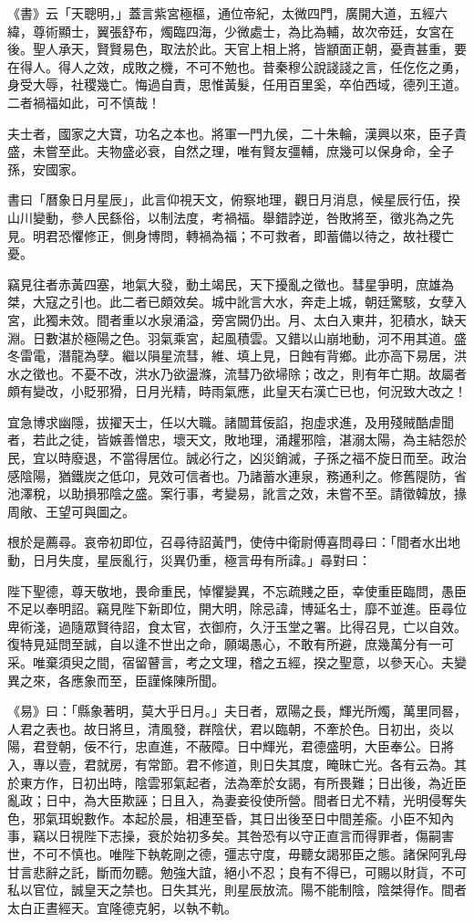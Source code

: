\begin{pinyinscope}
《書》云「天聰明，」蓋言紫宮極樞，通位帝紀，太微四門，廣開大道，五經六緯，尊術顯士，翼張舒布，燭臨四海，少微處士，為比為輔，故次帝廷，女宮在後。聖人承天，賢賢易色，取法於此。天官上相上將，皆顓面正朝，憂責甚重，要在得人。得人之效，成敗之機，不可不勉也。昔秦穆公說諓諓之言，任仡仡之勇，身受大辱，社稷幾亡。悔過自責，思惟黃髮，任用百里奚，卒伯西域，德列王道。二者禍福如此，可不慎哉！

夫士者，國家之大寶，功名之本也。將軍一門九侯，二十朱輪，漢興以來，臣子貴盛，未嘗至此。夫物盛必衰，自然之理，唯有賢友彊輔，庶幾可以保身命，全子孫，安國家。

書曰「曆象日月星辰」，此言仰視天文，俯察地理，觀日月消息，候星辰行伍，揆山川變動，參人民繇俗，以制法度，考禍福。舉錯誖逆，咎敗將至，徵兆為之先見。明君恐懼修正，側身博問，轉禍為福；不可救者，即蓄備以待之，故社稷亡憂。

竊見往者赤黃四塞，地氣大發，動土竭民，天下擾亂之徵也。彗星爭明，庶雄為桀，大寇之引也。此二者已頗效矣。城中訛言大水，奔走上城，朝廷驚駭，女孽入宮，此獨未效。間者重以水泉涌溢，旁宮闕仍出。月、太白入東井，犯積水，缺天淵。日數湛於極陽之色。羽氣乘宮，起風積雲。又錯以山崩地動，河不用其道。盛冬雷電，潛龍為孽。繼以隕星流彗，維、填上見，日蝕有背鄉。此亦高下易居，洪水之徵也。不憂不改，洪水乃欲盪滌，流彗乃欲埽除；改之，則有年亡期。故屬者頗有變改，小貶邪猾，日月光精，時雨氣應，此皇天右漢亡已也，何況致大改之！

宜急博求幽隱，拔擢天士，任以大職。諸闒茸佞諂，抱虛求進，及用殘賊酷虐聞者，若此之徒，皆嫉善憎忠，壞天文，敗地理，涌趯邪陰，湛溺太陽，為主結怨於民，宜以時廢退，不當得居位。誠必行之，凶災銷滅，子孫之福不旋日而至。政治感陰陽，猶鐵炭之低卬，見效可信者也。乃諸蓄水連泉，務通利之。修舊隄防，省池澤稅，以助損邪陰之盛。案行事，考變易，訛言之效，未嘗不至。請徵韓放，掾周敞、王望可與圖之。

根於是薦尋。哀帝初即位，召尋待詔黃門，使侍中衛尉傅喜問尋曰：「間者水出地動，日月失度，星辰亂行，災異仍重，極言毋有所諱。」尋對曰：

陛下聖德，尊天敬地，畏命重民，悼懼變異，不忘疏賤之臣，幸使重臣臨問，愚臣不足以奉明詔。竊見陛下新即位，開大明，除忌諱，博延名士，靡不並進。臣尋位卑術淺，過隨眾賢待詔，食太官，衣御府，久汙玉堂之署。比得召見，亡以自效。復特見延問至誠，自以逢不世出之命，願竭愚心，不敢有所避，庶幾萬分有一可采。唯棄須臾之間，宿留瞽言，考之文理，稽之五經，揆之聖意，以參天心。夫變異之來，各應象而至，臣謹條陳所聞。

《易》曰：「縣象著明，莫大乎日月。」夫日者，眾陽之長，輝光所燭，萬里同晷，人君之表也。故日將旦，清風發，群陰伏，君以臨朝，不牽於色。日初出，炎以陽，君登朝，佞不行，忠直進，不蔽障。日中輝光，君德盛明，大臣奉公。日將入，專以壹，君就房，有常節。君不修道，則日失其度，晻昧亡光。各有云為。其於東方作，日初出時，陰雲邪氣起者，法為牽於女謁，有所畏難；日出後，為近臣亂政；日中，為大臣欺誣；日且入，為妻妾役使所營。間者日尤不精，光明侵奪失色，邪氣珥蜺數作。本起於晨，相連至昏，其日出後至日中間差瘉。小臣不知內事，竊以日視陛下志操，衰於始初多矣。其咎恐有以守正直言而得罪者，傷嗣害世，不可不慎也。唯陛下執乾剛之德，彊志守度，毋聽女謁邪臣之態。諸保阿乳母甘言悲辭之託，斷而勿聽。勉強大誼，絕小不忍；良有不得已，可賜以財貨，不可私以官位，誠皇天之禁也。日失其光，則星辰放流。陽不能制陰，陰桀得作。間者太白正晝經天。宜隆德克躬，以執不軌。


\end{pinyinscope}
